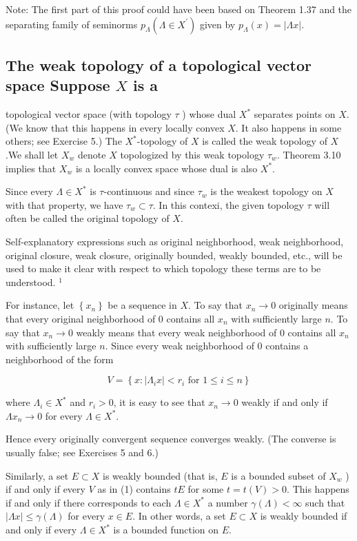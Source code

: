 \documentclass[10pt]{article}
\begin{document}
Note: The first part of this proof could have been based on Theorem 1.37 and the separating family of seminorms $p_{\Lambda}\left(\Lambda \in X^{\prime}\right)$ given by $p_{\Lambda}(x)=|\Lambda x|$.

\subsection{The weak topology of a topological vector space Suppose $X$ is a}
 topological vector space (with topology $\tau$ ) whose dual $X^{*}$ separates points on $X$. (We know that this happens in every locally convex $X$. It also happens in some others; see Exercise 5.) The $X^{*}$-topology of $X$ is called the weak topology of $X$.We shall let $X_{w}$ denote $X$ topologized by this weak topology $\tau_{w}$. Theorem 3.10 implies that $X_{w}$ is a locally convex space whose dual is also $X^{*}$.

Since every $\Lambda \in X^{*}$ is $\tau$-continuous and since $\tau_{w}$ is the weakest topology on $X$ with that property, we have $\tau_{w} \subset \tau$. In this contexi, the given topology $\tau$ will often be called the original topology of $X$.

Self-explanatory expressions such as original neighborhood, weak neighborhood, original closure, weak closure, originally bounded, weakly bounded, etc., will be used to make it clear with respect to which topology these terms are to be understood. ${ }^{1}$

For instance, let $\left\{x_{n}\right\}$ be a sequence in $X$. To say that $x_{n} \rightarrow 0$ originally means that every original neighborhood of 0 contains all $x_{n}$ with sufficiently large $n$. To say that $x_{n} \rightarrow 0$ weakly means that every weak neighborhood of 0 contains all $x_{n}$ with sufficiently large $n$. Since every weak neighborhood of 0 contains a neighborhood of the form

$$
V=\left\{x:\left|\Lambda_{i} x\right|<r_{i} \text { for } 1 \leq i \leq n\right\}
$$

where $\Lambda_{i} \in X^{*}$ and $r_{i}>0$, it is easy to see that $x_{n} \rightarrow 0$ weakly if and only if $\Lambda x_{n} \rightarrow 0$ for every $\Lambda \in X^{*}$.

Hence every originally convergent sequence converges weakly. (The converse is usually false; see Exercises 5 and 6.)

Similarly, a set $E \subset X$ is weakly bounded (that is, $E$ is a bounded subset of $X_{w}$ ) if and only if every $V$ as in (1) contains $t E$ for some $t=t(V)>0$. This happens if and only if there corresponds to each $\Lambda \in X^{*}$ a number $\gamma(\Lambda)<\infty$ such that $|\Lambda x| \leq \gamma(\Lambda)$ for every $x \in E$. In other words, a set $E \subset X$ is weakly bounded if and only if every $\Lambda \in X^{*}$ is a bounded function on $E$.
\end{document}
